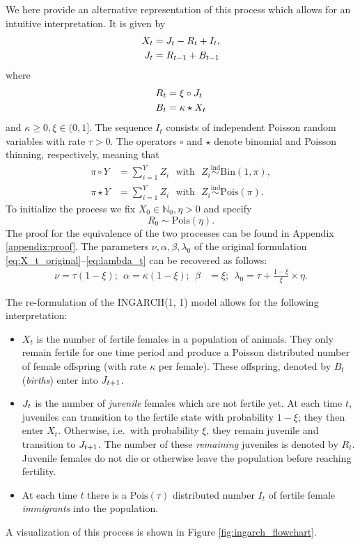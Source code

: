 \documentclass[10pt,a4paper]{article}
\begin{document}
We here provide an alternative representation of this process which allows for an intuitive interpretation. It is given by
\begin{align}
X_t & = J_t - R_t + I_t,\label{eq:X_t}\\
J_t & = R_{t - 1} + B_{t - 1}\label{eq:juv_t}
\end{align}
where
\begin{align}
R_t & = \xi \circ J_{t}\label{eq:R_t}\\
B_t & = \kappa \star X_t \label{eq:B_t}
\end{align}
and $\kappa \geq 0, \xi \in (0, 1]$. The sequence $I_t$ consists of independent Poisson random variables with rate $\tau > 0$. The operators $\circ$ and $\star$ denote binomial and Poisson thinning, respectively, meaning that
\begin{align*}
\pi \circ Y & = \sum_{i = 1}^Y Z_i \ \ \ \text{with} \ \ \ Z_i \stackrel{\text{ind}}{\sim} \text{Bin}(1, \pi), \\
\pi \star Y & = \sum_{i = 1}^Y Z_i \ \ \ \text{with} \ \ \ Z_i \stackrel{\text{ind}}{\sim} \text{Pois}(\pi).
\end{align*}
To initialize the process we fix $X_0 \in \mathbb{N}_0, \eta > 0$ and specify
$$
R_0 \sim \text{Pois}\left(\eta \right).
$$
The proof for the equivalence of the two processes can be found in Appendix \ref{appendix:proof}. The parameters $\nu, \alpha, \beta, \lambda_0$ of the original formulation \eqref{eq:X_t_original}--\eqref{eq:lambda_t} can be recovered as follows:
\begin{align*}
\nu = \tau(1 - \xi);\ \
\alpha = \kappa(1 - \xi);\ \
\beta & = \xi; \ \
\lambda_0 = \tau + \frac{1 - \xi}{\xi} \times \eta.
\end{align*}


The re-formulation of the INGARCH(1, 1) model allows for the following interpretation:
\begin{itemize}
\item $X_t$ is the number of fertile females in a population of animals. They only remain fertile for one time period and produce a Poisson distributed number of female offspring (with rate $\kappa$ per female). These offspring, denoted by $B_t$ (\textit{births}) enter into $J_{t + 1}$.
\item $J_t$ is the number of \textit{juvenile} females which are not fertile yet. At each time $t$, juveniles can transition to the fertile state with probability $1 - \xi$; they then enter $X_t$. Otherwise, i.e.\ with probability $\xi$, they remain juvenile and transition to $J_{t + 1}$. The number of these \textit{remaining} juveniles is denoted by $R_t$. Juvenile females do not die or otherwise leave the population before reaching fertility.
\item At each time $t$ there is a $\text{Pois}(\tau)$ distributed number $I_t$ of fertile female \textit{immigrants} into the population.
\end{itemize}
A visualization of this process is shown in Figure \ref{fig:ingarch_flowchart}.
\end{document}
